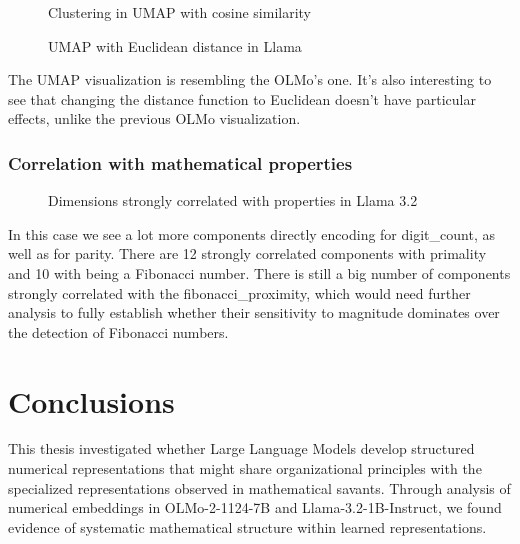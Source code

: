 \documentclass[
  a4paper, twoside, 10pt, titlepage]{book}
\makeatletter
\newcommand*\pandocbounded[1]{%
  \sbox\pandoc@box{#1}%
  \Gscale@div\@tempa{\textheight}{\dimexpr\ht\pandoc@box+\dp\pandoc@box\relax}%
  \Gscale@div\@tempb{\linewidth}{\wd\pandoc@box}%
  \ifdim\@tempb\p@<\@tempa\p@\let\@tempa\@tempb\fi%
  \ifdim\@tempa\p@<\p@\scalebox{\@tempa}{\usebox\pandoc@box}%
  \else\usebox{\pandoc@box}%
  \fi%
}
\makeatother
\begin{document}
\begin{figure}
\centering
\pandocbounded{}
\caption{Clustering in UMAP with cosine
similarity}\label{fig-llama-umap-cosine-digits}
\end{figure}

\begin{figure}
\centering
\pandocbounded{}
\caption{UMAP with Euclidean distance in
Llama}\label{fig-llama-umap-euclidean}
\end{figure}

The UMAP visualization is resembling the OLMo's one. It's also
interesting to see that changing the distance function to Euclidean
doesn't have particular effects, unlike the previous OLMo visualization.

\subsection{Correlation with mathematical
properties}\label{correlation-with-mathematical-properties-1}

\begin{figure}
\centering
\pandocbounded{}
\caption{Dimensions strongly correlated with properties in Llama
3.2}\label{fig-llama-properties}
\end{figure}

In this case we see a lot more components directly encoding for
digit\_count, as well as for parity. There are 12 strongly correlated
components with primality and 10 with being a Fibonacci number. There is
still a big number of components strongly correlated with the
fibonacci\_proximity, which would need further analysis to fully
establish whether their sensitivity to magnitude dominates over the
detection of Fibonacci numbers.

\chapter{Conclusions}\label{conclusions}

This thesis investigated whether Large Language Models develop
structured numerical representations that might share organizational
principles with the specialized representations observed in mathematical
savants. Through analysis of numerical embeddings in OLMo-2-1124-7B and
Llama-3.2-1B-Instruct, we found evidence of systematic mathematical
structure within learned representations.
\end{document}
